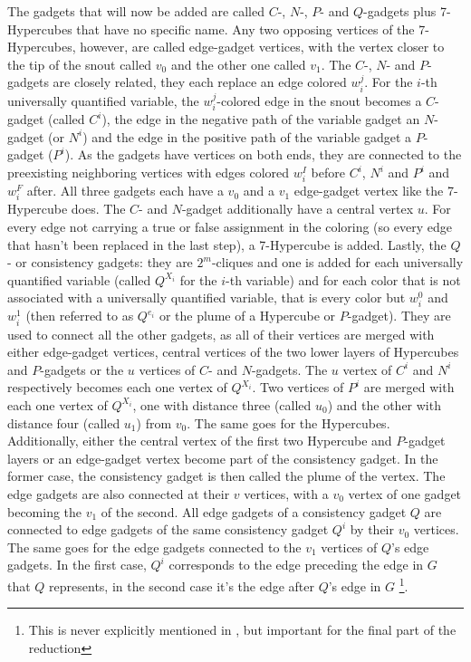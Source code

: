 \documentclass[12pt,a4paper]{article}
\begin{document}
\newline
The gadgets that will now be added are called $C$-, $N$-, $P$- and $Q$-gadgets plus 7-Hypercubes that have no specific name. Any two opposing vertices of the 7-Hypercubes, however, are called edge-gadget vertices, with the vertex closer to the tip of the snout called $v_0$ and the other one called $v_1$. The $C$-, $N$- and $P$-gadgets are closely related, they each replace an edge colored $w^j_i$. For the $i$-th universally quantified variable, the $w^j_i$-colored edge in the snout becomes a $C$-gadget (called $C^i$), the edge in the negative path of the variable gadget an $N$-gadget (or $N^i$) and the edge in the positive path of the variable gadget a $P$-gadget ($P^i$). As the gadgets have vertices on both ends, they are connected to the preexisting neighboring vertices with edges colored $w^I_i$ before $C^i$, $N^i$ and $P^i$ and $w^F_i$ after. All three gadgets each have a $v_0$ and a $v_1$ edge-gadget vertex like the 7-Hypercube does. The $C$- and $N$-gadget additionally have a central vertex $u$. For every edge not carrying a true or false assignment in the coloring (so every edge that hasn't been replaced in the last step), a 7-Hypercube is added. 
\newline
Lastly, the $Q$- or consistency gadgets: they are $2^m$-cliques and one is added for each universally quantified variable (called $Q^{X_i}$ for the $i$-th variable) and for each color that is not associated with a universally quantified variable, that is every color but $w^0_i$ and $w^1_i$ (then referred to as $Q^{e_i}$ or the plume of a Hypercube or $P$-gadget). They are used to connect all the other gadgets, as all of their vertices are merged with either edge-gadget vertices, central vertices of the two lower layers of Hypercubes and $P$-gadgets or the $u$ vertices of $C$- and $N$-gadgets. The $u$ vertex of $C^i$ and $N^i$ respectively becomes each one vertex of $Q^{X_i}$. Two vertices of $P^i$ are merged with each one vertex of $Q^{X_i}$, one with distance three (called $u_0$) and the other with distance four (called $u_1$) from $v_0$. The same goes for the Hypercubes. Additionally, either the central vertex of the first two Hypercube and $P$-gadget layers or an edge-gadget vertex become part of the consistency gadget. In the former case, the consistency gadget is then called the plume of the vertex.
\newline
The edge gadgets are also connected at their $v$ vertices, with a $v_0$ vertex of one gadget becoming the $v_1$ of the second. All edge gadgets of a consistency gadget $Q$ are connected to edge gadgets of the same consistency gadget $Q^i$ by their $v_0$ vertices. The same goes for the edge gadgets connected to the $v_1$ vertices of $Q$'s edge gadgets. In the first case, $Q^i$ corresponds to the edge preceding the edge in $G$ that $Q$ represents, in the second case it's the edge after $Q$'s edge in $G$ \footnote{This is never explicitly mentioned in \citep{Manin2008}, but important for the final part of the reduction}.
\end{document}
